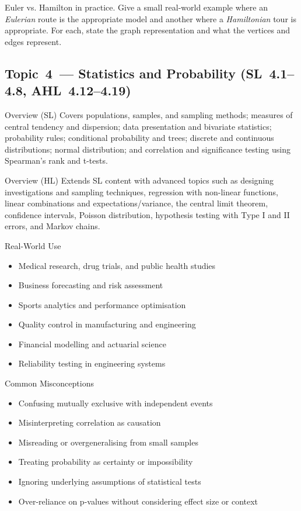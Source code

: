 \documentclass[11pt]{article}
\def\textbf#1{#1}%
\newcommand{\tocsubsection}[1]{\subsection{#1}}
\newcounter{question}
\begin{document}
\begin{question}
\textbf{Euler vs. Hamilton in practice.}
Give a small real-world example where an \emph{Eulerian} route is the appropriate model and another where a \emph{Hamiltonian} tour is appropriate. For each, state the graph representation and what the vertices and edges represent.
\end{question}





\tocsubsection{Topic 4 — Statistics and Probability (SL 4.1–4.8, AHL 4.12–4.19)}
\textbf{Overview (SL)}  
Covers populations, samples, and sampling methods; measures of central tendency and dispersion; data presentation and bivariate statistics; probability rules; conditional probability and trees; discrete and continuous distributions; normal distribution; and correlation and significance testing using Spearman’s rank and t-tests.

\textbf{Overview (HL)}  
Extends SL content with advanced topics such as designing investigations and sampling techniques, regression with non-linear functions, linear combinations and expectations/variance, the central limit theorem, confidence intervals, Poisson distribution, hypothesis testing with Type I and II errors, and Markov chains.

\textbf{Real-World Use}  
\begin{itemize}
  \item Medical research, drug trials, and public health studies
  \item Business forecasting and risk assessment
  \item Sports analytics and performance optimisation
  \item Quality control in manufacturing and engineering
  \item Financial modelling and actuarial science
  \item Reliability testing in engineering systems
\end{itemize}

\textbf{Common Misconceptions}  
\begin{itemize}
  \item Confusing mutually exclusive with independent events
  \item Misinterpreting correlation as causation
  \item Misreading or overgeneralising from small samples
  \item Treating probability as certainty or impossibility
  \item Ignoring underlying assumptions of statistical tests
  \item Over-reliance on p-values without considering effect size or context
\end{itemize}
\end{document}
